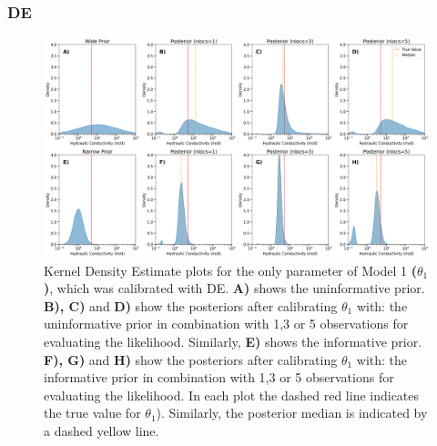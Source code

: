 \subsubsection{DE}\label{sub_DE}
\begin{figure}[ht]
\centering
\includegraphics[width=1.0\textwidth]{Figures/appendix_figs/kde_model1_DE.png}
\caption{Kernel Density Estimate plots for the only parameter of Model 1 \textbf{($\theta_1$)}, which was calibrated with DE. \textbf{A)} shows the uninformative prior. \textbf{B), C)} and \textbf{D)} show the posteriors after calibrating $\theta_1$ with: the uninformative prior in combination with 1,3 or 5 observations for evaluating the likelihood. Similarly, \textbf{E)} shows the informative prior. \textbf{F), G)} and \textbf{H)} show the posteriors after calibrating $\theta_1$ with: the informative prior in combination with 1,3 or 5 observations for evaluating the likelihood. In each plot the dashed red line indicates the true value for $\theta_1$). Similarly, the posterior median is indicated by a dashed yellow line.}\label{fig_kde_model1_DE}
\end{figure}

